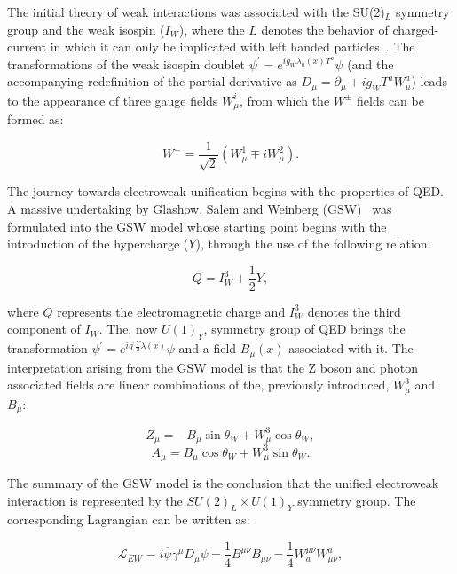 \hspace{10pt} The initial theory of weak interactions was associated with the SU(2)$_L$ symmetry group and the weak isospin ($I_W$), where the $L$ denotes the behavior of charged-current in which it can only be implicated with left handed particles~\cite{thomson_2013, book:schwartz}. The transformations of the weak isospin doublet $\psi^{'} = e^{ig_W\lambda_a(x)T^a}\psi$ (and the accompanying redefinition of the partial derivative as $D_\mu = \partial_{\mu}+ig_WT^aW_\mu^a$) leads to the appearance of three gauge fields $W_\mu^i$, from which the $W^{\pm}$ fields can be formed as:

\begin{equation}
    W^{\pm} = \frac{1}{\sqrt{2}}(W_\mu^1\mp iW_\mu^2).
\end{equation}

\hspace{10pt} The journey towards electroweak unification begins with the properties of QED. A massive undertaking by Glashow, Salem and Weinberg (GSW)~\cite{glashow,salam,weinberg} was formulated into the GSW model whose starting point begins with the introduction of the hypercharge ($Y$), through the use of the following relation:

\begin{equation}
    Q = I_W^3+\frac{1}{2}Y,
\end{equation}

where $Q$ represents the electromagnetic charge and $I_W^{3}$ denotes the third component of $I_W$. The, now $U(1)_Y$, symmetry group of QED brings the transformation $\psi^{'} = e^{ig^{'}\frac{Y}{2}\lambda(x)}\psi$ and a field $B_{\mu}(x)$ associated with it. The interpretation arising from the GSW model is that the Z boson and photon associated fields are linear combinations of the, previously introduced, $W^{3}_{\mu}$ and $B_{\mu}$:

\begin{equation}
    Z_{\mu} = -B_{\mu}\sin\theta_W + W^3_{\mu}\cos\theta_W,
\end{equation}  
\begin{equation}
    A_{\mu} = B_{\mu}\cos\theta_W + W^3_{\mu}\sin\theta_W.
\end{equation}

The summary of the GSW model is the conclusion that the unified electroweak interaction is represented by the $SU(2)_L\times U(1)_Y$ symmetry group. The corresponding Lagrangian can be written as:

\begin{equation}
    \mathcal{L}_{EW} = i\overline{\psi}\gamma^{\mu}D_{\mu}\psi - \frac{1}{4}B^{\mu\nu}B_{\mu\nu} - \frac{1}{4}W^{\mu\nu}_aW^a_{\mu\nu},
    \label{eq:ew_unification}
\end{equation}

